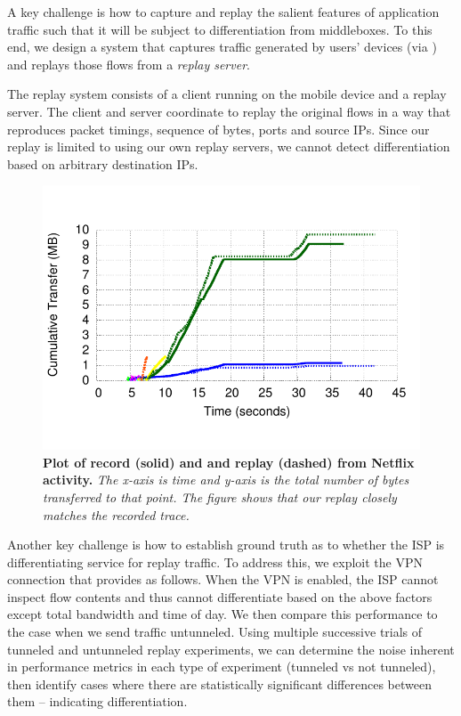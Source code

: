 A key challenge is how to capture and replay 
the salient features of application traffic such that it will be subject to differentiation 
from middleboxes. To this end, we design a system that captures 
traffic generated by users' devices (via \meddle) and replays those flows 
from a \emph{replay server}. 

The replay system consists of a client running on the mobile device and a replay server. 
The client and server coordinate to replay the original flows in a way that reproduces packet timings, 
sequence of bytes, ports and source IPs. Since our replay is limited to using our own replay servers,
 we cannot detect differentiation based on arbitrary destination IPs. 


\begin{figure}
\centering
\includegraphics[width=0.9\linewidth]{plots/netflix_seqnum_wifi_vs_cell.pdf}
\caption{\textbf{Plot of record (solid) and and replay (dashed) from Netflix activity.} \emph{The x-axis is time and y-axis is the 
total number of bytes transferred to that point. The figure shows that our replay closely matches 
the recorded trace.}}
\vspace{\postfigspace}
\label{fig:replaySimilarity}
\end{figure}

Another key challenge is how to establish ground truth as to whether the ISP is 
differentiating service for replay traffic. To address this, we exploit the VPN connection 
that \meddle provides as follows. When the 
VPN is enabled, the ISP cannot inspect flow contents and thus cannot differentiate based 
on the above factors except total bandwidth and time of day. 
We then compare this performance to the case when we send traffic untunneled.  
Using multiple successive trials of tunneled and untunneled replay experiments, 
we can determine the noise inherent in performance metrics in each type of experiment (tunneled vs not tunneled), then 
identify cases where there are statistically significant differences between 
them -- indicating differentiation. 

